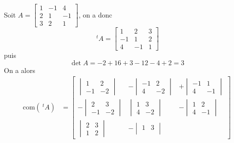 \documentclass[11pt,colorlinks]{book}
\theoremstyle{mytheoremstyle}
\theoremstyle{mytheoremstyle}
\theoremstyle{mytheoremstyle}
\theoremstyle{mytheoremstyle}
\theoremstyle{mytheoremstyle}
\theoremstyle{mytheoremstyle}
\theoremstyle{mytheoremstyle}
\theoremstyle{mytheoremstyle}
\theoremstyle{myproblemstyle}
\begin{document}
\begin{ex}
  Soit $A = \begin{bmatrix}
    1 & -1 & 4 \\ 
    2 & 1 & -1 \\ 
    3 & 2 & 1
  \end{bmatrix}$, on a donc 
  \begin{equation*}
  ~^tA = \begin{bmatrix}
    1 & 2 & 3 \\ 
    -1 & 1 & 2 \\ 
    4 & -1 & 1
  \end{bmatrix}
  \end{equation*}
  puis 
  \begin{equation*}
    \det A = -2 + 16 + 3 -12 -4 + 2 = 3
  \end{equation*}
  On a alors
  \begin{align*}
    \text{com}(~^tA) &= 
    \begin{bmatrix}
      \begin{vmatrix}
        1 & 2 \\ 
        -1 & -2
      \end{vmatrix}&
      - \begin{vmatrix}
        -1 & 2 \\ 
        4 & -2
      \end{vmatrix}&
      + \begin{vmatrix}
        -1 & 1 \\ 
        4 & -1
      \end{vmatrix}\\ 
      - \begin{vmatrix}
        2 & 3 \\ 
        -1 & -2
      \end{vmatrix}&
      \begin{vmatrix}
        1 & 3 \\ 
        4 & -2
      \end{vmatrix}&
      - \begin{vmatrix}
        1 & 2 \\ 
        4 & -1
      \end{vmatrix}\\ 
      \begin{vmatrix}
        2 & 3 \\ 
        1 & 2
      \end{vmatrix}&
      - \begin{vmatrix}
        1 & 3 \\ 

\end{vmatrix}
\end{bmatrix}
\end{align*}
\end{ex}
\end{document}

